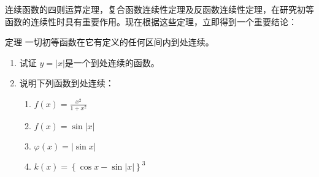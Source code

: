 连续函数的四则运算定理，复合函数连续性定理及反函数连续性定理，在研究初等函数的连续性时具有重要作用。现在根据这些定理，立即得到一个重要结论：

\begin{blk}
 {定理} 一切初等函数在它有定义的任何区间内到处连续。
\end{blk}

\begin{ex}
\begin{enumerate}
    \item 试证 $y=|x|$是一个到处连续的函数。
    \item 说明下列函数到处连续：
\begin{multicols}{2}
\begin{enumerate}
    \item $f(x)=\frac{x^2}{1+x^2}$
    \item $f(x)=\sin|x|$
    \item $\varphi(x)=|\sin x|$
    \item $k(x)=\left\{\cos x-\sin|x|\right\}^3$
\end{enumerate}
\end{multicols}


\end{enumerate}
\end{ex}
